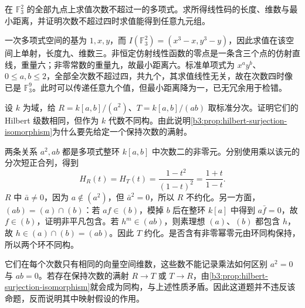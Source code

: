 \begin{exercise}\label{b3:ex:11-reed-muller-plane}
	在 \(\mathbb F_3^2\) 的全部九点上求值次数不超过一的多项式。求所得线性码的长度、维数与最小距离，并证明次数不超过四时求值能得到任意九元组。
\end{exercise}
\begin{solution}
	一次多项式空间的基为 \(1,x,y\)，而 \(I(\mathbb F_3^2)=(x^3-x,y^3-y)\)，因此求值在该空间上单射，长度九、维数三。非恒定仿射线性函数的零点是一条含三个点的仿射直线，重量六；非零常数的重量九，故最小距离六。标准单项式为 \(x^ay^b\)、\(0\le a,b\le2\)，全部全次数不超过四，共九个，其求值线性无关，故在次数四时像已是 \(\mathbb F_3^9\)。此时可以传递任意九个值，但最小距离降为一，已无冗余用于检错。
\end{solution}

\begin{exercise}\label{b3:ex:11-same-series-different-rings}
	设 \(k\) 为域，给 \(R=k[a,b]/(a^2)\)、\(T=k[a,b]/(ab)\) 取标准分次。证明它们的 Hilbert 级数相同，但作为 \(k\) 代数不同构。由此说明\cref{b3:prop:hilbert-surjection-isomorphism}为什么要先给定一个保持次数的满射。
\end{exercise}
\begin{solution}
	两条关系 \(a^2,ab\) 都是多项式整环 \(k[a,b]\) 中次数二的非零元。分别使用乘以该元的分次短正合列，得到
	\[
		H_R(t)=H_T(t)=\dfrac{1-t^2}{(1-t)^2} =\dfrac{1+t}{1-t}.
	\]
	\(R\) 中 \(\bar a\ne0\)，因为 \(a\notin(a^2)\)，但 \(\bar a^2=0\)，所以 \(R\) 不约化。另一方面，\((ab)=(a)\cap(b)\)：若 \(af\in(b)\)，模掉 \(b\) 后在整环 \(k[a]\) 中得到 \(a\bar f=0\)，故 \(f\in(b)\)，证明非平凡包含。若 \(h^m\in(ab)\)，则素理想 \((a)\)、\((b)\) 都包含 \(h\)，故 \(h\in(a)\cap(b)=(ab)\)。因此 \(T\) 约化。是否含有非零幂零元由环同构保持，所以两个环不同构。

	它们在每个次数只有相同的向量空间维数，这些数不能记录乘法如何区别 \(a^2=0\) 与 \(ab=0\)。若存在保持次数的满射 \(R\to T\) 或 \(T\to R\)，由\cref{b3:prop:hilbert-surjection-isomorphism}就会成为同构，与上述性质矛盾。因此这道题并不违反该命题，反而说明其中映射假设的作用。
\end{solution}
